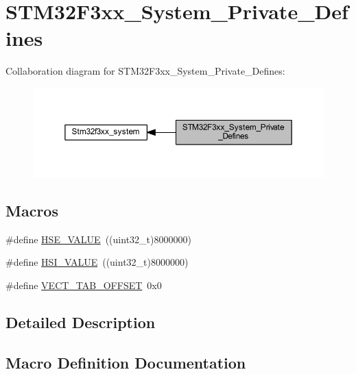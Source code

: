 \hypertarget{group___s_t_m32_f3xx___system___private___defines}{}\section{S\+T\+M32\+F3xx\+\_\+\+System\+\_\+\+Private\+\_\+\+Defines}
\label{group___s_t_m32_f3xx___system___private___defines}
Collaboration diagram for S\+T\+M32\+F3xx\+\_\+\+System\+\_\+\+Private\+\_\+\+Defines\+:\nopagebreak
\begin{figure}[H]
\begin{center}
\leavevmode
\includegraphics[width=350pt]{group___s_t_m32_f3xx___system___private___defines}
\end{center}
\end{figure}
\subsection*{Macros}
\begin{DoxyCompactItemize}
\item 
\#define \hyperlink{group___s_t_m32_f3xx___system___private___defines_gaeafcff4f57440c60e64812dddd13e7cb}{H\+S\+E\+\_\+\+V\+A\+L\+U\+E}~((uint32\+\_\+t)8000000)
\item 
\#define \hyperlink{group___s_t_m32_f3xx___system___private___defines_gaaa8c76e274d0f6dd2cefb5d0b17fbc37}{H\+S\+I\+\_\+\+V\+A\+L\+U\+E}~((uint32\+\_\+t)8000000)
\item 
\#define \hyperlink{group___s_t_m32_f3xx___system___private___defines_ga40e1495541cbb4acbe3f1819bd87a9fe}{V\+E\+C\+T\+\_\+\+T\+A\+B\+\_\+\+O\+F\+F\+S\+E\+T}~0x0
\end{DoxyCompactItemize}


\subsection{Detailed Description}


\subsection{Macro Definition Documentation}
\hypertarget{group___s_t_m32_f3xx___system___private___defines_gaeafcff4f57440c60e64812dddd13e7cb}{}

